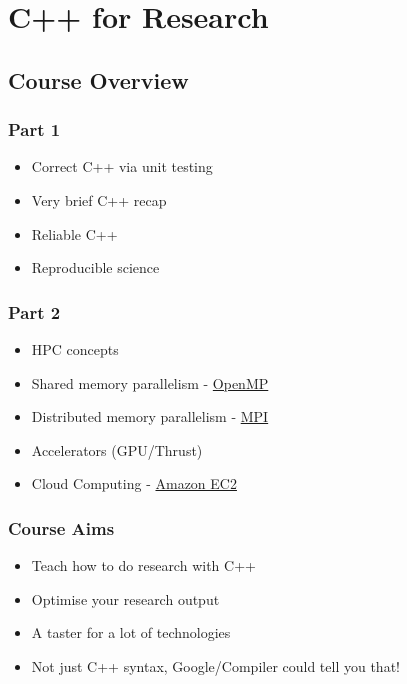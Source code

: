 \section{C++ for Research}\label{c-for-research}

\subsection{Course Overview}\label{course-overview}

\subsubsection{Part 1}\label{part-1}

\begin{itemize}
\itemsep1pt\parskip0pt
\item
  Correct C++ via unit testing
\item
  Very brief C++ recap
\item
  Reliable C++
\item
  Reproducible science
\end{itemize}

\subsubsection{Part 2}\label{part-2}

\begin{itemize}
\itemsep1pt\parskip0pt
\item
  HPC concepts
\item
  Shared memory parallelism - \href{http://www.openmp.org}{OpenMP}
\item
  Distributed memory parallelism - \href{http://www.open-mpi.org}{MPI}
\item
  Accelerators (GPU/Thrust)
\item
  Cloud Computing - \href{http://aws.amazon.com/}{Amazon EC2}
\end{itemize}

\subsubsection{Course Aims}\label{course-aims}

\begin{itemize}
\itemsep1pt\parskip0pt
\item
  Teach how to do research with C++
\item
  Optimise your research output
\item
  A taster for a lot of technologies
\item
  Not just C++ syntax, Google/Compiler could tell you that!
\end{itemize}

